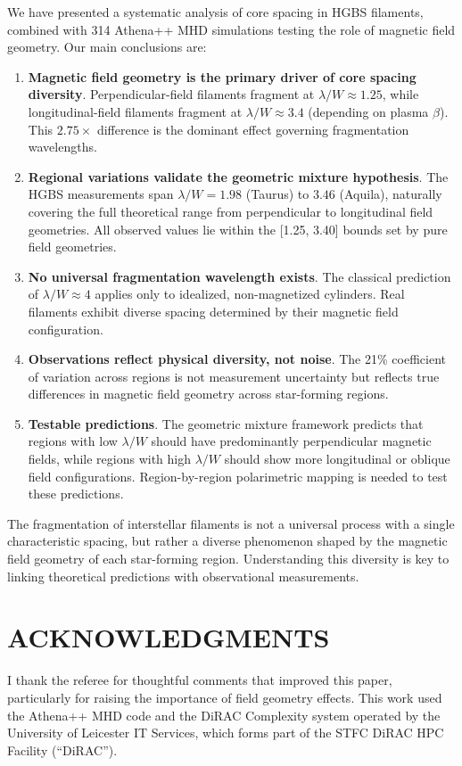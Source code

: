 \documentclass[twoside,twocolumn]{mnras}
\begin{document}
We have presented a systematic analysis of core spacing in HGBS filaments, combined with 314 Athena++ MHD simulations testing the role of magnetic field geometry. Our main conclusions are:

\begin{enumerate}
    \item \textbf{Magnetic field geometry is the primary driver of core spacing diversity}. Perpendicular-field filaments fragment at $\lambda/W \approx 1.25$, while longitudinal-field filaments fragment at $\lambda/W \approx 3.4$ (depending on plasma $\beta$). This $2.75\times$ difference is the dominant effect governing fragmentation wavelengths.

    \item \textbf{Regional variations validate the geometric mixture hypothesis}. The HGBS measurements span $\lambda/W = 1.98$ (Taurus) to $3.46$ (Aquila), naturally covering the full theoretical range from perpendicular to longitudinal field geometries. All observed values lie within the [1.25, 3.40] bounds set by pure field geometries.

    \item \textbf{No universal fragmentation wavelength exists}. The classical prediction of $\lambda/W \approx 4$ applies only to idealized, non-magnetized cylinders. Real filaments exhibit diverse spacing determined by their magnetic field configuration.

    \item \textbf{Observations reflect physical diversity, not noise}. The 21\% coefficient of variation across regions is not measurement uncertainty but reflects true differences in magnetic field geometry across star-forming regions.

    \item \textbf{Testable predictions}. The geometric mixture framework predicts that regions with low $\lambda/W$ should have predominantly perpendicular magnetic fields, while regions with high $\lambda/W$ should show more longitudinal or oblique field configurations. Region-by-region polarimetric mapping is needed to test these predictions.
\end{enumerate}

The fragmentation of interstellar filaments is not a universal process with a single characteristic spacing, but rather a diverse phenomenon shaped by the magnetic field geometry of each star-forming region. Understanding this diversity is key to linking theoretical predictions with observational measurements.

\section*{ACKNOWLEDGMENTS}

I thank the referee for thoughtful comments that improved this paper, particularly for raising the importance of field geometry effects. This work used the Athena++ MHD code and the DiRAC Complexity system operated by the University of Leicester IT Services, which forms part of the STFC DiRAC HPC Facility (``DiRAC'').



\end{document}
